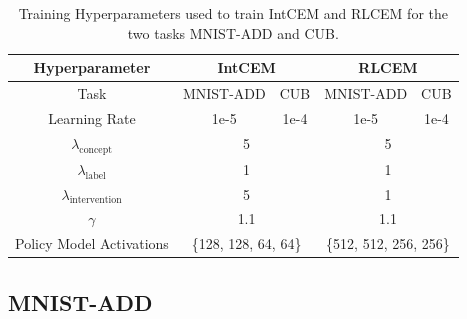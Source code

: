 \begin{table}[!ht]
    \centering
    \renewcommand{\arraystretch}{1.5}
    \begin{tabular}{c|cccc}
        Hyperparameter & \multicolumn{2}{c}{IntCEM} & \multicolumn{2}{c}{RLCEM} \\
        \hline
        Task & MNIST-ADD & CUB &
        MNIST-ADD & CUB \\ 
        Learning Rate & 1e-5 & 1e-4 & 1e-5 & 1e-4 \\
        \hline
        $\lambda_{\text{concept}}$ & \multicolumn{2}{c}{5} & \multicolumn{2}{c}{5}\\
        $\lambda_{\text{label}}$ & \multicolumn{2}{c}{1} & \multicolumn{2}{c}{1}\\
        $\lambda_{\text{intervention}}$ & \multicolumn{2}{c}{5} & \multicolumn{2}{c}{1}\\
        $\gamma$ & \multicolumn{2}{c}{1.1} & \multicolumn{2}{c}{1.1} \\
        Policy Model Activations & \multicolumn{2}{c}{\{128, 128, 64, 64\}}
        &  \multicolumn{2}{c}{\{512, 512, 256, 256\}} \\
    \end{tabular}
    \caption{Training Hyperparameters used to train IntCEM and RLCEM for the 
    two tasks MNIST-ADD and CUB. }
    \label{table:hyperparameters}
\end{table}

\subsection{MNIST-ADD}

